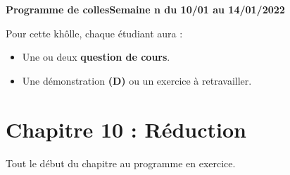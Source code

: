 \documentclass[twoside,a4paper,french,10pt]{VcCours}
\begin{document}

\begin{center}
\large\bf
Programme de collesSemaine n du 10/01 au 14/01/2022
\end{center}
\separationTitre


Pour cette khôlle, chaque étudiant aura :
\begin{itemize}
\item Une ou deux \textbf{question de cours}.
\item Une démonstration \textbf{(D)} ou un exercice à retravailler.
\end{itemize} 

\section*{Chapitre 10 : Réduction}
Tout le début du chapitre au programme en exercice.
\end{document}
